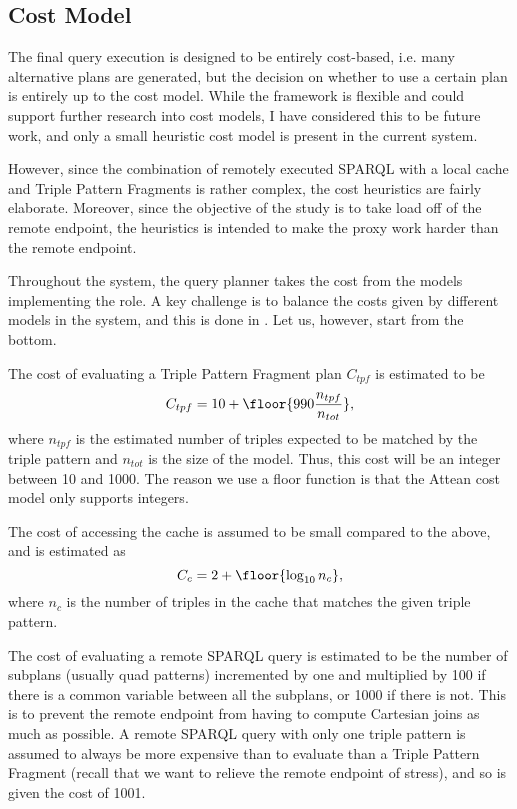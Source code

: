 \documentclass[a4paper, 12pt]{article}
\begin{document}
\subsection{Cost Model}\label{sec:costheuristics}

The final query execution is designed to be entirely cost-based,
i.e. many alternative plans are generated, but the decision on whether
to use a certain plan is entirely up to the cost model. While the
framework is flexible and could support further research into cost
models, I have considered this to be future work, and only a small
heuristic cost model is present in the current system. 

However, since the combination of remotely executed SPARQL with a
local cache and Triple Pattern Fragments is rather complex, the cost
heuristics are fairly elaborate. Moreover, since the objective of the
study is to take load off of the remote endpoint, the heuristics is
intended to make the proxy work harder than the remote endpoint.

Throughout the system, the query planner takes the cost from the
models implementing the  role. A
key challenge is to balance the costs given by different models in the
system, and this is done in
. Let us, however, start
from the bottom. 

The cost of evaluating a Triple Pattern Fragment plan $C_{tpf}$ is estimated to
be 
\begin{equation}
C_{tpf} = 10 + \floor{990 \frac{n_{tpf}}{n_{tot}}} ,
\end{equation}
where $n_{tpf}$ is the estimated number of triples expected to be
matched by the triple pattern and $n_{tot}$ is the size of the
model. Thus, this cost will be an integer between 10 and 1000. The
reason we use a floor function is that the Attean cost model only
supports integers.

The cost of accessing the cache is assumed to be small compared to the
above, and is estimated as 
\begin{equation}
C_c = 2 + \floor{\log_{10}{n_c}} , 
\end{equation}
where $n_c$ is the number of triples in the cache that matches the
given triple pattern.

The cost of evaluating a remote SPARQL query is estimated to be the
number of subplans (usually quad patterns) incremented by one and
multiplied by 100 if there is a common variable between all the
subplans, or 1000 if there is not. This is to prevent the remote
endpoint from having to compute Cartesian joins as much as possible. A
remote SPARQL query with only one triple pattern is assumed to always
be more expensive than to evaluate than a Triple Pattern Fragment
(recall that we want to relieve the remote endpoint of stress), and so
is given the cost of 1001.
\end{document}
